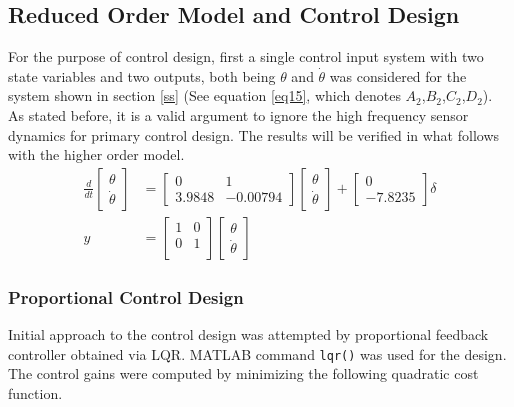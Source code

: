 \documentclass[12pt]{article}
\begin{document}
	\subsection{Reduced Order Model and Control Design}
	\label{2ndordermodel}
	For the purpose of control design, first a single control input system with two state variables and two outputs, both being $ \theta $ and $ \dot{\theta}$ was considered for the system shown in section \ref{ss} (See equation \ref{eq15}, which denotes $A_2$,$B_2$,$C_2$,$D_2$). As stated before, it is a valid argument to ignore the high frequency sensor dynamics for primary control design. The results will be verified in what follows with the higher order model.
	\begin{equation}
	\label{eq15}
	\begin{split}
	\frac{d}{dt}
	\begin{bmatrix}
	\theta \\ \dot{\theta}
	\end{bmatrix}
	&= \begin{bmatrix}
	0 & 1 \\
	3.9848 & -0.00794
	\end{bmatrix}\begin{bmatrix}
	\theta \\ \dot{\theta}
	\end{bmatrix} + \begin{bmatrix}
	0 \\ -7.8235
	\end{bmatrix}\delta \\
	y &= \begin{bmatrix}
	1 & 0\\
	0 & 1\\
	\end{bmatrix}\begin{bmatrix}
	\theta \\ \dot{\theta}
	\end{bmatrix}
	\end{split}
	\end{equation}
	
	\subsubsection{Proportional Control Design}
	\label{pcontrol}
	Initial approach to the control design was attempted by proportional feedback controller obtained via LQR. MATLAB command \texttt{lqr()} was used for the design. The control gains were computed by minimizing the following quadratic cost function. 
	
\end{document}
